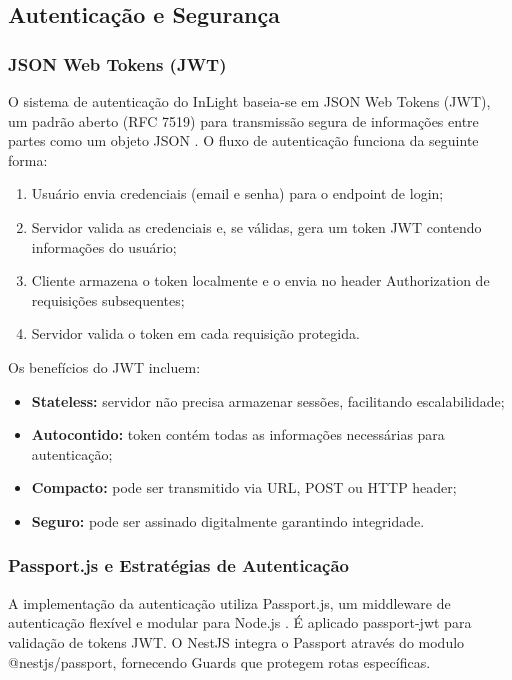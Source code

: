 \subsection{Autenticação e Segurança}

\subsubsection{JSON Web Tokens (JWT)}
O sistema de autenticação do InLight baseia-se em JSON Web Tokens (JWT), um padrão aberto (RFC 7519) para transmissão segura de informações entre partes como um objeto JSON \cite{jones2015}. O fluxo de autenticação funciona da seguinte forma:
\begin{enumerate}
    \item Usuário envia credenciais (email e senha) para o endpoint de login;
    \item Servidor valida as credenciais e, se válidas, gera um token JWT contendo informações do usuário;
    \item Cliente armazena o token localmente e o envia no header Authorization de requisições subsequentes;
    \item Servidor valida o token em cada requisição protegida.
\end{enumerate}

Os benefícios do JWT incluem:

\begin{itemize}
    \item \textbf{Stateless:} servidor não precisa armazenar sessões, facilitando escalabilidade;
    \item \textbf{Autocontido:} token contém todas as informações necessárias para autenticação;
    \item \textbf{Compacto:} pode ser transmitido via URL, POST ou HTTP header;
    \item \textbf{Seguro:} pode ser assinado digitalmente garantindo integridade.
\end{itemize}

\subsubsection{Passport.js e Estratégias de Autenticação}
A implementação da autenticação utiliza Passport.js, um middleware de autenticação flexível e modular para Node.js \cite{passport2023}.
É aplicado passport-jwt para validação de tokens JWT. O NestJS integra o Passport através do modulo @nestjs/passport, fornecendo Guards que protegem rotas específicas.
